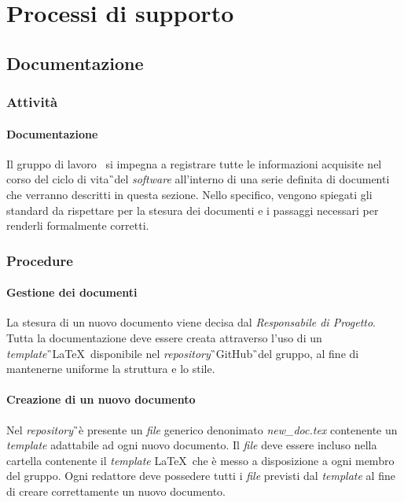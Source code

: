 \section{Processi di supporto}
\subsection{Documentazione}
\subsubsection{Attività}
\paragraph{Documentazione} 
Il gruppo di lavoro \GRUPPO\ si impegna a registrare tutte le informazioni acquisite nel corso del ciclo di vita\G\ del \textit{software} all'interno di una serie definita di documenti che verranno descritti in questa sezione. Nello specifico, vengono spiegati gli standard da rispettare per la stesura dei documenti e i passaggi necessari per renderli formalmente corretti.

\subsubsection{Procedure}
\paragraph{Gestione dei documenti}
La stesura di un nuovo documento viene decisa dal \textit{Responsabile di Progetto}. Tutta la documentazione deve essere creata attraverso l'uso di un \textit{template}\G\ \LaTeX\ disponibile nel \textit{repository}\G\ GitHub\G\ del gruppo, al fine di mantenerne uniforme la struttura e lo stile.

\paragraph{Creazione di un nuovo documento}
Nel \textit{repository}\G\ è presente un \textit{file} generico denonimato \textit{new\_doc.tex} contenente un \textit{template} adattabile ad ogni nuovo documento. Il \textit{file} deve essere incluso nella cartella contenente il \textit{template} \LaTeX\, che è messo a disposizione a ogni membro del gruppo. Ogni redattore deve possedere tutti i \textit{file} previsti dal \textit{template} al fine di creare correttamente un nuovo documento.

